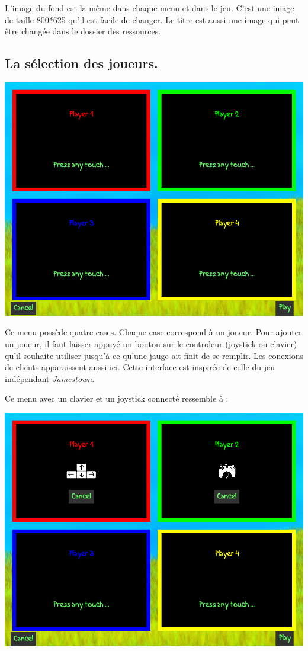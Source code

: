 \documentclass{article}
\begin{document}
L'image du fond est la même dans chaque menu et dans le jeu. C'est une image de taille 800*625 qu'il est facile de changer. Le titre est aussi une image qui peut être changée dans le dossier des ressources.

\subsection{La sélection des joueurs.} \label{select}
\begin{center}
	\includegraphics[scale=0.4]{img/empty.png}
\end{center}
Ce menu possède quatre cases. Chaque case correspond à un joueur. Pour ajouter un joueur, il faut laisser appuyé un bouton sur le controleur (joystick ou clavier) qu'il souhaite utiliser jusqu'à ce qu'une jauge ait finit de se remplir. Les conexions de clients apparaissent aussi ici. Cette interface est inspirée de celle du jeu indépendant \emph{Jamestown}.

Ce menu avec un clavier et un joystick connecté ressemble à :
\begin{center}
	\includegraphics[scale=0.4]{img/full.png}
\end{center}
\end{document}
